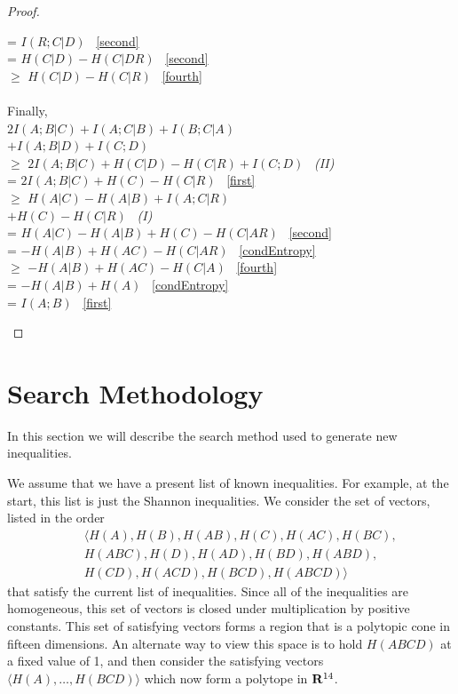 \documentclass[10pt,journal]{IEEEtran}
\begin{document}
\begin{proof}
\begin{tabbing}
=           \> $I(R;C|D)$                     \> \ \eqref{second}     \\
=           \> $H(C|D){-}H(C|DR)$              \> \ \eqref{second}          \\
$\geq$      \> $H(C|D){-}H(C|R)$               \> \ \eqref{fourth}           \\
\\
Finally,\\
            \> $2I(A;B|C){+}I(A;C|B){+}I(B;C|A)$\\
            \> ${+}I(A;B|D){+}I(C;D)$  \\
$\geq$      \> $2I(A;B|C){+}H(C|D){-}H(C|R){+}I(C;D)$  \> \ \emph{(II)}\\
=           \> $2I(A;B|C){+} H(C){-}H(C|R)$ \> \ \eqref{first}   \\
$\geq$      \> $H(A|C) {-}H(A|B) {+} I(A;C|R)$ \\
            \> ${+}H(C) {-}H(C|R)$  \> \ \emph{(I)}\\
=           \> $H(A|C) {-}H(A|B) {+} H(C) {-}H(C|AR)$ \> \ \eqref{second} \\
=           \> ${-}H(A|B) {+}H(AC) {-}H(C|AR)$ \> \ \eqref{condEntropy} \\
$\geq$      \> ${-}H(A|B) {+}H(AC) {-}H(C|A)$   \> \ \eqref{fourth}  \\
=            \> ${-}H(A|B) {+}H(A)$ \> \ \eqref{condEntropy}\\
=           \> $I(A;B)$\> \ \eqref{first}  \\
\end{tabbing}
\end{proof}


\section{Search Methodology}
\label{sec:search}

In this section we will describe the search method used to generate new inequalities.

We assume that we have a present list of known inequalities.  For example, at the start, this list is just the Shannon inequalities.
We consider the set of vectors, listed in the order
\begin{eqnarray}
&&\langle H(A),H(B),H(AB),H(C),H(AC),H(BC),\nonumber\\
&&H(ABC),H(D),H(AD),H(BD),H(ABD),\nonumber\\
&&H(CD),H(ACD),H(BCD),H(ABCD)\label{vertex} \rangle
\end{eqnarray}
that satisfy the current list of inequalities.
Since all of the inequalities are homogeneous, this set of vectors is closed
under multiplication by positive constants.
This set of satisfying vectors forms a region that is a polytopic cone in fifteen dimensions.
An alternate way to view this space is to hold $H(ABCD)$ at a fixed value of 1, and then
consider the satisfying vectors $\langle H(A), \ldots, H(BCD)\rangle$ which now form a polytope in
$\mathbf{R}^{14}$.
\end{document}
